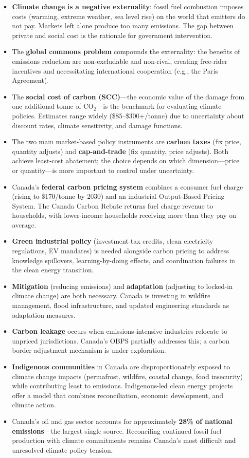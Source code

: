 \begin{itemize}
  \item \textbf{Climate change is a negative externality}: fossil fuel combustion imposes costs (warming, extreme weather, sea level rise) on the world that emitters do not pay. Markets left alone produce too many emissions. The gap between private and social cost is the rationale for government intervention.
  \item The \textbf{global commons problem} compounds the externality: the benefits of emissions reduction are non-excludable and non-rival, creating free-rider incentives and necessitating international cooperation (e.g., the Paris Agreement).
  \item The \textbf{social cost of carbon (SCC)}---the economic value of the damage from one additional tonne of CO$_2$---is the benchmark for evaluating climate policies. Estimates range widely (\$85--\$300+/tonne) due to uncertainty about discount rates, climate sensitivity, and damage functions.
  \item The two main market-based policy instruments are \textbf{carbon taxes} (fix price, quantity adjusts) and \textbf{cap-and-trade} (fix quantity, price adjusts). Both achieve least-cost abatement; the choice depends on which dimension---price or quantity---is more important to control under uncertainty.
  \item Canada's \textbf{federal carbon pricing system} combines a consumer fuel charge (rising to \$170/tonne by 2030) and an industrial Output-Based Pricing System. The Canada Carbon Rebate returns fuel charge revenue to households, with lower-income households receiving more than they pay on average.
  \item \textbf{Green industrial policy} (investment tax credits, clean electricity regulations, EV mandates) is needed alongside carbon pricing to address knowledge spillovers, learning-by-doing effects, and coordination failures in the clean energy transition.
  \item \textbf{Mitigation} (reducing emissions) and \textbf{adaptation} (adjusting to locked-in climate change) are both necessary. Canada is investing in wildfire management, flood infrastructure, and updated engineering standards as adaptation measures.
  \item \textbf{Carbon leakage} occurs when emissions-intensive industries relocate to unpriced jurisdictions. Canada's OBPS partially addresses this; a carbon border adjustment mechanism is under exploration.
  \item \textbf{Indigenous communities} in Canada are disproportionately exposed to climate change impacts (permafrost, wildfire, coastal change, food insecurity) while contributing least to emissions. Indigenous-led clean energy projects offer a model that combines reconciliation, economic development, and climate action.
  \item Canada's oil and gas sector accounts for approximately \textbf{28\% of national emissions}---the largest single source. Reconciling continued fossil fuel production with climate commitments remains Canada's most difficult and unresolved climate policy tension.
\end{itemize}

